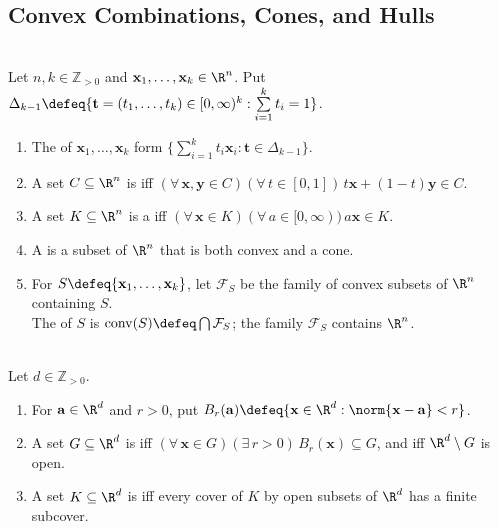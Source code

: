 \subsection{Convex Combinations, Cones, and Hulls}

\begin{definition} \label{def:convex-combinations-cones-hulls} \\
Let $n,k\in\mathbb{Z}_{>0}$ and $\mathbf{x}_1,\ldots,\mathbf{x}_k\in\R^n$. Put $\Delta_{k-1}\defeq\{\mathbf{t}=(t_1,\ldots,t_k)\in[0,\infty)^k:\sum\limits_{i=1}^{k}t_i=1\}$.
\begin{enumerate}[label=(\roman*)]
\setlength{\itemsep}{0pt}
\item The  of $\mathbf{x}_1,\ldots,\mathbf{x}_k$ form $\{\sum\limits_{i=1}^{k}t_i\mathbf{x}_i:\mathbf{t}\in\Delta_{k-1}\}$.
\item A set $C\subseteq\R^n$ is  iff $(\forall\,\mathbf{x},\mathbf{y}\in C)(\forall\,t\in[0,1])\,t\mathbf{x}+(1-t)\mathbf{y}\in C$.
\item A set $K\subseteq\R^n$ is a  iff $(\forall\,\mathbf{x}\in K)(\forall\,a\in[0,\infty))\,a\mathbf{x}\in K$.
\item A  is a subset of $\R^n$ that is both convex and a cone.
\item For $S\defeq\{\mathbf{x}_1,\ldots,\mathbf{x}_k\}$, let $\mathcal{F}_S$ be the family of convex subsets of $\R^n$ containing $S$.\\
The  of $S$ is $\operatorname{conv}(S)\defeq\bigcap\mathcal{F}_S$; the family $\mathcal{F}_S$ contains $\R^n$.
\end{enumerate}
\end{definition}

\begin{definition} \label{def:euclidean-topological-scope-convex-geometry} \\
Let $d\in\mathbb{Z}_{>0}$.
\begin{enumerate}[label=(\roman*)]
\setlength{\itemsep}{0pt}
\item For $\mathbf{a}\in\R^d$ and $r>0$, put $B_r(\mathbf{a})\defeq\{\mathbf{x}\in\R^d:\norm{\mathbf{x}-\mathbf{a}}<r\}$.
\item A set $G\subseteq\R^d$ is  iff $(\forall\,\mathbf{x}\in G)(\exists\,r>0)\,B_r(\mathbf{x})\subseteq G$, and  iff $\R^d\setminus G$ is open.
\item A set $K\subseteq\R^d$ is  iff every cover of $K$ by open subsets of $\R^d$ has a finite subcover.
\end{enumerate}
\end{definition}

